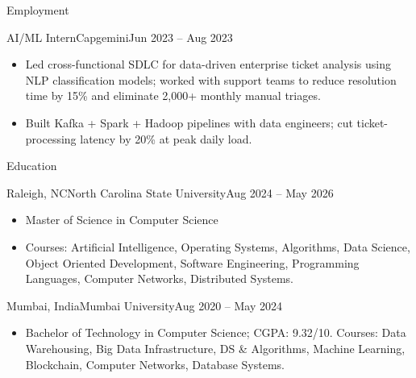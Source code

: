 \documentclass[]{mcdowellcv}
\begin{document}
\begin{cvsection}{Employment}
  \begin{cvsubsection}{AI/ML Intern}{Capgemini}{Jun 2023 -- Aug 2023}
    \begin{itemize}
      \item Led cross-functional SDLC for data-driven enterprise ticket analysis using NLP classification models; worked with support teams to reduce resolution time by 15\% and eliminate 2,000+ monthly manual triages.
      \item Built Kafka + Spark + Hadoop pipelines with data engineers; cut ticket-processing latency by 20\% at peak daily load.
    \end{itemize}
    \vspace{-1.5pt}
  \end{cvsubsection}
\end{cvsection}

\begin{cvsection}{Education}
  \begin{cvsubsection}{Raleigh, NC}{North Carolina State University}{Aug 2024 -- May 2026}
    \begin{itemize}
      \item Master of Science in Computer Science
      \item Courses: Artificial Intelligence, Operating Systems, Algorithms, Data Science, Object Oriented Development, Software Engineering, Programming Languages, Computer Networks, Distributed Systems.
    \end{itemize}
    \vspace{-1.5pt}
  \end{cvsubsection}

  \begin{cvsubsection}{Mumbai, India}{Mumbai University}{Aug 2020 -- May 2024}
    \begin{itemize}
      \item Bachelor of Technology in Computer Science; CGPA: 9.32/10. Courses: Data Warehousing, Big Data Infrastructure, DS \& Algorithms, Machine Learning, Blockchain, Computer Networks, Database Systems.
    \end{itemize}
    \vspace{-1.5pt}
  \end{cvsubsection}
\end{cvsection}
\end{document}
